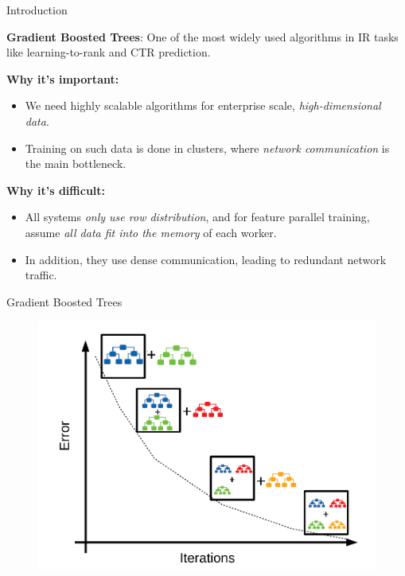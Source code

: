 \documentclass[final]{beamer}
\newlength{\onecolwid}
\begin{document}
\begin{frame}[t]
\begin{columns}[t]
\begin{column}{\onecolwid}
	\begin{block}{Introduction}
	
		\textbf{Gradient Boosted Trees}: One of the most widely used algorithms
		in IR tasks like learning-to-rank
		and CTR prediction.
	
		\vspace{15pt}
		\textbf{Why it's important:}
	
		\begin{itemize}
			\item We need highly scalable algorithms for enterprise scale, \emph{high-dimensional
			data}.
			\item Training on such data is done in clusters, where \emph{network communication}
			is the main bottleneck. %
		\end{itemize}
	
		\textbf{Why it's difficult:}
	
		\begin{itemize}
	
		\item All systems \emph{only use row distribution},
			and for feature parallel training, assume \emph{all data fit into the memory} of each worker.
		\item In addition, they use dense communication, leading to redundant network
			traffic.
		\end{itemize}
	
	\end{block}


	\begin{block}{Gradient Boosted Trees}
	
		\begin{figure}
		\includegraphics[width=\onecolwid]{gbt-illustration}
			\label{fig:gbt-training}
		\end{figure}
	

\end{block}
\end{column}
\end{columns}
\end{frame}
\end{document}
